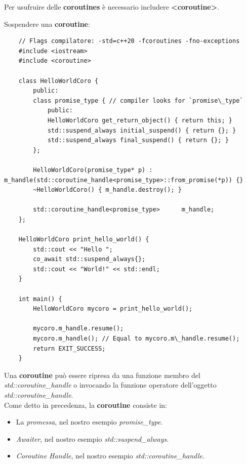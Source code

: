 \textsf{\small Per usufruire delle \textbf{coroutines} è necessario includere \textbf{<coroutine>}.} \break

\textsf{\small Sospendere una \textbf{coroutine}: } \\

\begin{lstlisting}
	// Flags compilatore: -std=c++20 -fcoroutines -fno-exceptions
	#include <iostream>
	#include <coroutine>
	
	class HelloWorldCoro {
		public:
		class promise_type { // compiler looks for `promise\_type`
			public:
			HelloWorldCoro get_return_object() { return this; }    
			std::suspend_always initial_suspend() { return {}; }        
			std::suspend_always final_suspend() { return {}; }
		};
		
		HelloWorldCoro(promise_type* p) : m_handle(std::coroutine_handle<promise_type>::from_promise(*p)) {}
		~HelloWorldCoro() { m_handle.destroy(); }
		
		std::coroutine_handle<promise_type>      m_handle;
	};
	
	HelloWorldCoro print_hello_world() {
		std::cout << "Hello ";
		co_await std::suspend_always{};
		std::cout << "World!" << std::endl;
	}
	
	int main() {
		HelloWorldCoro mycoro = print_hello_world();
		
		mycoro.m_handle.resume();
		mycoro.m_handle(); // Equal to mycoro.m\_handle.resume();
		return EXIT_SUCCESS;
	}
\end{lstlisting}

\textsf{\small Una \textbf{coroutine} può essere ripresa da una funzione membro del \emph{std::coroutine\_handle} o invocando la funzione operatore dell'oggetto \emph{std::coroutine\_handle}.} \\

\textsf{\small Come detto in precedenza, la \textbf{coroutine} consiste in: } \\

\begin{itemize}
	\item \textsf{\small La \emph{promessa}, nel nostro esempio \emph{promise\_type}.}
	\item \textsf{\small \emph{Awaiter}, nel nostro esempio \emph{std::suspend\_always}.}
	\item \textsf{\small \emph{Coroutine Handle}, nel nostro esempio \emph{std::coroutine\_handle}.}
\end{itemize}


